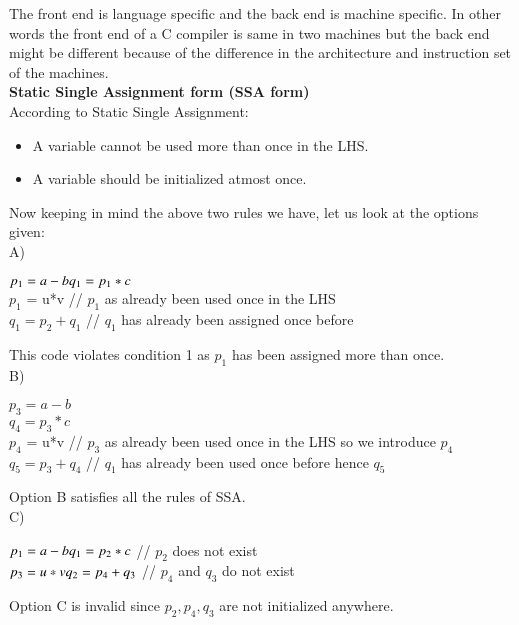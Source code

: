 \documentclass[journal,12pt,twocolumn]{IEEEtran}
\begin{document}
 The front end is language specific and the back end is machine specific. In other words the front end of a C compiler is same in two machines but the back end might be different because of the difference in the architecture and instruction set of the machines. \\
 
 \textbf{Static Single Assignment form (SSA form)} \\
According to Static Single Assignment: 
\begin{itemize}
    \item A variable cannot be used more than once in the LHS.
    \item A variable should be initialized atmost once.
\end{itemize}

Now keeping in mind the above two rules we have, let us look at the options given: \\
A) 
\begin{tcolorbox}[colback=white]
$p_{1}  = a - b \\
q_{1}  = p_1*c$ \\
$p_{1}$  = u*v // $p_{1}$ as already been used once in the LHS \\ 
$q_{1}  = p_{2} + q_{1}$ // $q_{1}$ has already been assigned once before \\ 
\end{tcolorbox}
This code violates condition 1 as $p_1$ has been assigned more than once. \\
B)
\begin{tcolorbox}[colback=white]
$p_{3}  = a - b$ \\
$q_{4}  = p_3*c$ \\
$p_{4}$  = u*v // $p_{3}$ as already been used once in the LHS so we introduce $p_4$ \\ 
$q_{5}  = p_{3} + q_{4}$ // $q_{1}$ has already been used once before hence $q_5$\\ 
\end{tcolorbox}
Option B satisfies all the rules of SSA. \\
C)
\begin{tcolorbox}[colback=white]
$p_{1}  = a - b \\
q_{1}  = p_2*c$ // $p_2$ does not exist \\
$p_{3}  = u*v  \\
q_{2}  = p_{4} + q_{3}$ // $p_4$ and $q_3$ do not exist\\
\end{tcolorbox}
Option C is invalid since $p_2,p_4,q_3$ are not initialized anywhere. \\
\end{document}
